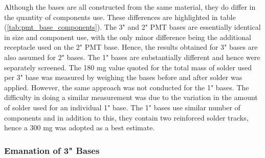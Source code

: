 Although the bases are all constructed from the same material, they do differ in the quantity of components use. These differences are highlighted in table (\ref{tab:pmt_base_components}). The 3" and 2" PMT bases are essentially identical in size and component use, with the only minor difference being the additional receptacle used on the 2" PMT base. Hence, the results obtained for 3" bases are also assumed for 2" bases. The 1" bases are substantially different and hence were separately screened. The 180 mg value quoted for the total mass of solder used per 3" base was measured by weighing the bases before and after solder was applied. However, the same approach was not conducted for the 1" bases. The difficulty in doing a similar measurement was due to the variation in the amount of solder used for an individual 1" base. The 1" bases use similar number of components and in addition to this, they contain two reinforced solder tracks, hence a 300 mg was adopted as a best estimate. 


\subsubsection{Emanation of 3" Bases}

